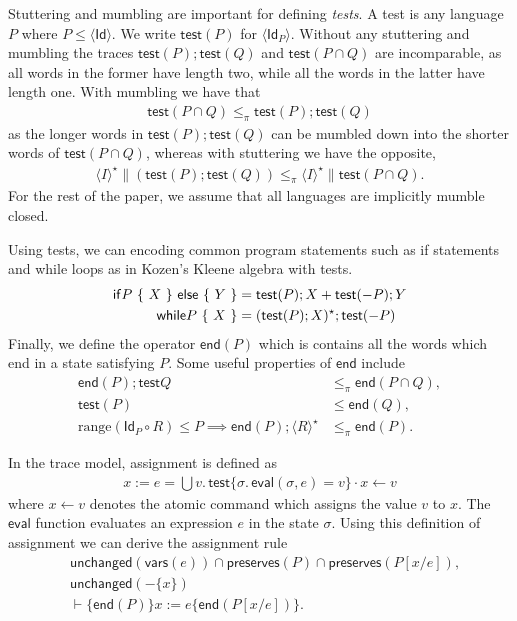 \documentclass{llncs}
\newcommand{\test}{\mathsf{test}}
\newcommand{\eval}{\mathsf{eval}}
\newcommand{\Id}{\mathsf{Id}}
\newcommand{\edn}{\mathsf{end}}
\newcommand{\unchanged}{\mathsf{unchanged}}
\newcommand{\preserves}{\mathsf{preserves}}
\begin{document}
Stuttering and mumbling are important for defining \emph{tests}. A
test is any language $P$ where $P \le \langle \Id\rangle$. We
write $\test(P)$ for $\langle \Id_P\rangle$. Without any
stuttering and mumbling the traces $\test(P); \test(Q)$ and
$\test(P \cap Q)$ are incomparable, as all words in the former have
length two, while all the words in the latter have length one. With mumbling we have that
\begin{align*}
\test(P \cap Q) \le_\pi \test(P); \test(Q)
\end{align*}
as the longer words in $\test(P);\test(Q)$ can be mumbled down into
the shorter words of $\test(P\cap Q)$, whereas with stuttering we
have the opposite,
\begin{align*}
\langle I\rangle^\star \| (\test(P);\test(Q)) \le_\pi \langle I\rangle^\star \| \test(P \cap Q).
\end{align*}
For the rest of the paper, we assume that all languages are
implicitly mumble closed.

Using tests, we can encoding common program statements such as if
statements and while loops as in Kozen's Kleene algebra with tests.
\begin{align*}
\mathsf{if } P \text{ \{ } X \text { \} \textsf{else} \{ } Y \text{ \}} &= \test(P); X + \test(- P); Y\\
\mathsf{while } P \text{ \{ } X \text{ \}} &= (\test(P);X)^\star;\test(- P)
\end{align*}
Finally, we define the operator $\edn(P)$ which is contains all the
words which end in a state satisfying $P$. Some useful properties of $\edn$ include
\begin{align*}
\edn(P); \test{Q} &\le_\pi \edn(P \cap Q),\\
\test(P) &\le \edn(Q),\\
\text{range}(\Id_P \circ R) \le P \implies \edn(P); \langle R\rangle^\star &\le_\pi \edn(P).
\end{align*}

In the trace model, assignment is defined as
\begin{align*}
  x := e = \bigcup v.\,\test\{\sigma.\,\eval(\sigma,e) = v\} \cdot x \leftarrow v
\end{align*}
where $x \leftarrow v$ denotes the atomic command which assigns the
value $v$ to $x$. The $\eval$ function evaluates an expression $e$ in
the state $\sigma$. Using this definition of assignment we can derive
the assignment rule
\begin{align*}
&\unchanged(\mathsf{vars}(e)) \cap \preserves(P) \cap \preserves(P[x/e]),\\
&\unchanged(- \{x\})\\
&\vdash \{\edn(P)\} x := e \{\edn(P[x/e])\}.
\end{align*}
\end{document}
